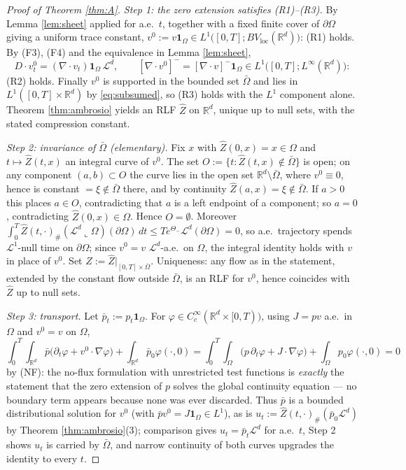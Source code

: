 \documentclass[11pt]{amsart}
\theoremstyle{definition}
\newcommand{\Ld}{\mathcal{L}^d}
\newcommand{\LL}[1]{\mathcal{L}^{#1}}
\newcommand{\dive}{\nabla\!\cdot}
\newcommand{\R}{\mathbb{R}}
\newcommand{\dd}{\,d}
\begin{document}
\begin{proof}[Proof of Theorem \ref{thm:A}]
\emph{Step 1: the zero extension satisfies (R1)--(R3).} By Lemma
\ref{lem:sheet} applied for a.e.\ $t$, together with a fixed finite
cover of $\partial\Omega$ giving a uniform trace constant,
$v^0:=v\mathbf{1}_\Omega\in
L^1\big([0,T];BV_{\mathrm{loc}}(\R^d)\big)$: (R1) holds. By (F3),
(F4) and the equivalence in Lemma \ref{lem:sheet},
\[
D\!\cdot v^0_t=(\dive v_t)\mathbf{1}_\Omega\,\Ld,\qquad
[\dive v^0]^-=[\dive v]^-\mathbf{1}_\Omega\in
L^1\big([0,T];L^\infty(\R^d)\big):
\]
(R2) holds. Finally $v^0$ is supported in the bounded set
$\bar\Omega$ and lies in $L^1([0,T]\times\R^d)$ by
\eqref{eq:subsumed}, so (R3) holds with the $L^1$ component alone.
Theorem \ref{thm:ambrosio} yields an RLF $\hat Z$ on $\R^d$, unique
up to null sets, with the stated compression constant.

\emph{Step 2: invariance of $\bar\Omega$ (elementary).} Fix $x$ with
$\hat Z(0,x)=x\in\Omega$ and $t\mapsto\hat Z(t,x)$ an integral curve
of $v^0$. The set $O:=\{t:\hat Z(t,x)\notin\bar\Omega\}$ is open; on
any component $(a,b)\subset O$ the curve lies in the open set
$\R^d\setminus\bar\Omega$, where $v^0\equiv0$, hence is constant
$=\xi\notin\bar\Omega$ there, and by continuity $\hat
Z(a,x)=\xi\notin\bar\Omega$. If $a>0$ this places $a\in O$,
contradicting that $a$ is a left endpoint of a component; so $a=0$,
contradicting $\hat Z(0,x)\in\Omega$. Hence $O=\emptyset$. Moreover
$\int_0^T\hat
Z(t,\cdot)_\#(\Ld\llcorner\Omega)(\partial\Omega)\dd t\le
Te^{\Theta_-}\Ld(\partial\Omega)=0$, so a.e.\ trajectory spends
$\LL{1}$-null time on $\partial\Omega$; since $v^0=v$
$\Ld$-a.e.\ on $\Omega$, the integral identity holds with $v$ in
place of $v^0$. Set $Z:=\hat Z|_{[0,T]\times\bar\Omega}$.
Uniqueness: any flow as in the statement, extended by the constant
flow outside $\bar\Omega$, is an RLF for $v^0$, hence coincides with
$\hat Z$ up to null sets.

\emph{Step 3: transport.} Let $\bar p_t:=p_t\mathbf{1}_\Omega$. For
$\varphi\in C_c^\infty(\R^d\times[0,T))$, using $J=pv$
a.e.\ in $\Omega$ and $v^0=v$ on $\Omega$,
\[
\int_0^T\!\!\int_{\R^d}\bar p\big(\partial_t\varphi+
v^0\cdot\nabla\varphi\big)+\int_{\R^d}\bar p_0\varphi(\cdot,0)
=\int_0^T\!\!\int_\Omega\big(p\,\partial_t\varphi+
J\cdot\nabla\varphi\big)+\int_\Omega p_0\varphi(\cdot,0)=0
\]
by (NF): the no-flux formulation with unrestricted test functions is
\emph{exactly} the statement that the zero extension of $p$ solves
the global continuity equation --- no boundary term appears because
none was ever discarded. Thus $\bar p$ is a bounded distributional
solution for $v^0$ (with $\bar pv^0=J\mathbf{1}_\Omega\in L^1$), as
is $u_t:=\hat Z(t,\cdot)_\#(\bar p_0\Ld)$ by Theorem
\ref{thm:ambrosio}(3); comparison gives $u_t=\bar p_t\Ld$ for
a.e.\ $t$, Step 2 shows $u_t$ is carried by $\bar\Omega$, and narrow
continuity of both curves upgrades the identity to every $t$.
\end{proof}
\end{document}
